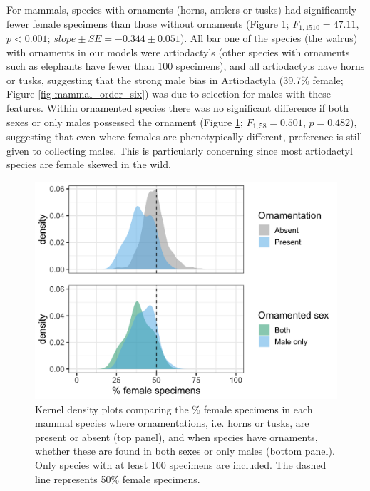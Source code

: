 \documentclass[a4paper, 12pt]{article}
\begin{document}
For mammals, species with ornaments (horns, antlers or tusks) had significantly fewer female specimens than those without ornaments (Figure \ref{fig-horns}; $F_{1, 1510} = 47.11$, $p < 0.001$; $slope \pm SE = -0.344 \pm 0.051$). 
All bar one of the species (the walrus) with ornaments in our models were artiodactyls (other species with ornaments such as elephants have fewer than 100 specimens), and all artiodactyls have horns or tusks, suggesting that the strong male bias in Artiodactyla (39.7\% female; Figure \ref{fig-mammal_order_six}) was due to selection for males with these features. 
Within ornamented species there was no significant difference if both sexes or only males possessed the ornament (Figure \ref{fig-horns}; $F_{1, 58} = 0.501$, $p = 0.482$), suggesting that even where females are phenotypically different, preference is still given to collecting males. 
This is particularly concerning since most artiodactyl species are female skewed in the wild\cite{berger1999sex}. 

\begin{figure}
 \centering
  \includegraphics[width = \linewidth]{figures/ornamentation.png}
  \caption{Kernel density plots comparing the \% female specimens in each mammal species where ornamentations, i.e. horns or tusks, are present or absent (top panel), and when species have ornaments, whether these are found in both sexes or only males (bottom panel). 
  Only species with at least 100 specimens are included. 
  The dashed line represents 50\% female specimens. 
}
  \label{fig-horns}
\end{figure}
\end{document}

